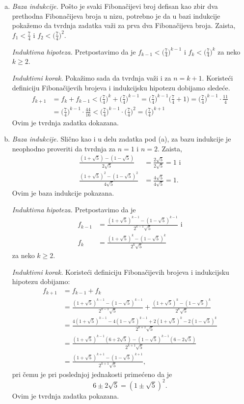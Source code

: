 \begin{enumerate}[(a)]
\item {\it Baza indukcije.} Po\v sto je svaki Fibona\v cijevi broj defisan kao zbir dva prethodna Fibona\v cijeva broja u nizu, potrebno je da u bazi indukcije poka\v zemo da tvrdnja zadatka va\v zi za prva dva Fibona\v cijeva broja. Zaista, $f_1<\frac 74$ i $f_2<\big(\frac 74\big)^2$.

{\it Induktivna hipoteza.} Pretpostavimo da je $f_{k-1}<\big(\frac 74\big)^{k-1}$ i $f_k<\big(\frac 74\big)^k$ za neko $k\geq 2$.

 {\it Induktivni korak.} Poka\v zimo sada da tvrdnja va\v zi i za $n=k+1$. Koriste\' ci definiciju Fibona\v cijevih brojeva i indukcijsku hipotezu dobijamo slede\' ce.
\begin{align*}
f_{k+1}&=f_k+f_{k-1}<\Big(\frac 74\Big)^k+\Big(\frac 74\Big)^{k-1}=\Big(\frac 74\Big)^{k-1}\Big(\frac 74 +1\Big)=\Big(\frac 74\Big)^{k-1}\cdot \frac {11}4\\
&=\Big(\frac 74\Big)^{k-1}\cdot \frac{44}{16}<\Big(\frac 74\Big)^{k-1}\cdot \Big(\frac 74\Big)^2=\Big(\frac 74\Big)^{k+1}
\end{align*}
Ovim je tvrdnja zadatka dokazana.
\item {\it Baza indukcije.} Sli\v cno kao i u delu zadatka pod (a), za bazu indukcije je neophodno proveriti da tvrdnja za $n=1$ i $n=2$. Zaista,
\begin{align*}
\frac{(1+\sqrt 5)-(1-\sqrt 5)}{2\sqrt 5}&=\frac{2\sqrt 5}{2\sqrt 5}=1\text{ i}\\
\frac{(1+\sqrt 5)^2-(1-\sqrt 5)^2}{4\sqrt 5}&= \frac{4\sqrt 5}{4\sqrt 5}=1.
\end{align*} 
Ovim je baza indukcije pokazana.

{\it Induktivna hipoteza.} Pretpostavimo da je
\begin{align*}
f_{k-1}&=\frac{(1+\sqrt 5)^{k-1}-(1-\sqrt 5)^{k-1}}{2^{k-1}\sqrt 5}\text{ i}\\
f_k&=\frac{(1+\sqrt 5)^k-(1-\sqrt 5)^k}{2^k\sqrt 5}
\end{align*}
za neko $k\geq 2$.

{\it Induktivni korak.} Koriste\' ci definiciju Fibona\v cijevih brojeva i indukcijsku hipotezu dobijamo:
\begin{align*}
f_{k+1}&=f_{k-1}+f_{k}\\
&=\frac{(1+\sqrt 5)^{k-1}-(1-\sqrt 5)^{k-1}}{2^{k-1}\sqrt 5}+\frac{(1+\sqrt 5)^k-(1-\sqrt 5)^k}{2^k\sqrt 5}\\
&=\frac{4(1+\sqrt 5)^{k-1}-4(1-\sqrt 5)^{k-1}+2(1+\sqrt 5)^k-2(1-\sqrt 5)^k}{2^{k+1}\sqrt 5}\\
&=\frac{(1+\sqrt 5)^{k-1}(6+2\sqrt 5)-(1-\sqrt 5)^{k-1}(6-2\sqrt 5)}{2^{k+1}\sqrt 5}\\
&=\frac{(1+\sqrt 5)^{k+1}-(1-\sqrt 5)^{k+1}}{2^{k+1}\sqrt 5},
\end{align*}
pri \v cemu je pri poslednjoj jednakosti prime\' ceno da je 
\[6\pm 2\sqrt 5=(1\pm \sqrt 5)^2.\]
Ovim je tvrdnja zadatka pokazana.
\end{enumerate}


